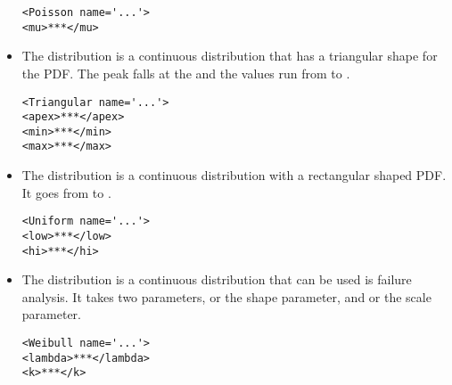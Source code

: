 \begin{itemize}
\begin{lstlisting}[style=XML]
<Poisson name='...'>
<mu>***</mu>
\end{lstlisting}


\item The  distribution is a continuous distribution
that has a triangular shape for the PDF.  The peak falls at the
 and the values run from  to
.

\begin{lstlisting}[style=XML]
<Triangular name='...'>
<apex>***</apex>
<min>***</min>
<max>***</max>
\end{lstlisting}



\item The  distribution is a continuous distribution with
a rectangular shaped PDF.  It goes from  to
.

\begin{lstlisting}[style=XML]
<Uniform name='...'>
<low>***</low>
<hi>***</hi>
\end{lstlisting}


\item The  distribution is a continuous distribution that
can be used is failure analysis.  It takes two parameters,
 or the shape parameter, and  or the
scale parameter.

\begin{lstlisting}[style=XML]
<Weibull name='...'>
<lambda>***</lambda>
<k>***</k>
\end{lstlisting}

\end{itemize}





